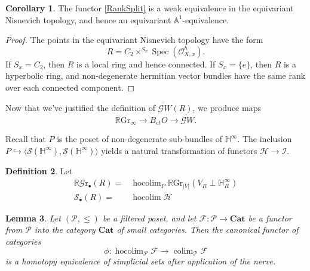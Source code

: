 \documentclass[draftthesis,tocnosub,noragright,centerchapter,10pt]{uiucthesis2009}
\newcommand{\mbb}{\mathbb}
\newcommand{\mc}{\mathcal}
\newcommand{\RGr}{\mathbb R\mathrm{Gr}}
\newcommand{\hRGr}{\mathbb R\mathscr{G}{\mathrm{r}}}
\newcommand{\Cat}{\mathbf{Cat}}
\DeclareMathOperator{\Spec}{Spec}
\DeclareMathOperator*{\hocolim}{hocolim}
\DeclareMathOperator*{\colim}{colim}
\theoremstyle{plain}
\newtheorem{lemma}{Lemma}
\theoremstyle{definition}
\newtheorem{corollary}[lemma]{Corollary}
\newtheorem{definition}[lemma]{Definition}
\begin{document}
\begin{corollary}
The functor \eqref{RankSplit} is a weak equivalence in the equivariant
Nisnevich topology, and hence an equivariant $\mbb A^1$-equivalence. 
\end{corollary}

\begin{proof}
The points in the equivariant Nisnevich topology have the form
\[
R = C_2 \times^{S_x} \Spec(\mc O^h_{X,x}).
\]
If $S_x = C_2$, then $R$ is a local ring and hence connected. If $S_x
= \{e\}$, then $R$ is a hyperbolic ring, and non-degenerate hermitian
vector bundles have the same rank over each connected component. 
\end{proof}

Now that we've justified the definition of $\widetilde{\mathscr
  GW}(R)$, we produce maps 
\[
\RGr_\infty \rightarrow B_{et} O \rightarrow \widetilde{\mathscr
  GW}.
\]

Recall that $P$ is the poset of non-degenerate sub-bundles of
$\mbb H^\infty$. The inclusion $P \hookrightarrow \langle \mc  S(\mbb
H^\infty),\mc S(\mbb H^\infty)\rangle$ yields a natural transformation
of functors $\mc H \rightarrow \mc I$. 

\begin{definition}
Let
\begin{align*}
\hRGr_\bullet(R) =& \hocolim_{P} \RGr_{|V|}(V_R
  \perp \mbb H^\infty_R)\\
\mathscr S_\bullet(R) =& \hocolim \mc H
\end{align*}
\end{definition}

\begin{lemma}
Let $(\mathscr P,\leq)$ be a filtered poset, and let $\mathscr F:
\mathscr P \rightarrow \Cat$ be a functor from $\mathscr P$ into the
category $\Cat$ of small categories. Then the canonical functor of categories
\[
\phi : \hocolim_{\mathscr P} \mathscr F \rightarrow \colim_{\mathscr
  P} \mathscr F
\]
is a homotopy equivalence of simplicial sets after application of the
nerve. 
\end{lemma}
\end{document}

